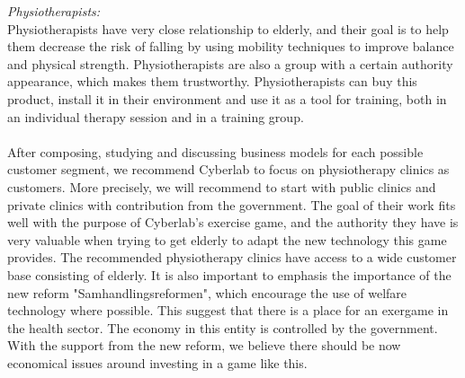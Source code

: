 \emph{Physiotherapists:} \\
Physiotherapists have very close relationship to elderly, and their goal is to help them decrease the risk of falling by using mobility techniques to improve balance and physical strength. Physiotherapists are also a group with a certain authority appearance, which makes them trustworthy. Physiotherapists can buy this product, install it in their environment and use it as a tool for training, both in an individual therapy session and in a training group. \\ \\
After composing, studying and discussing business models for each possible customer segment, we recommend Cyberlab to focus on physiotherapy clinics as customers. More precisely,  we will recommend to start with public clinics and private clinics with contribution from the government. The goal of their work fits well with the purpose of Cyberlab's exercise game, and the authority they have is very valuable when trying to get elderly to adapt the new technology this game provides. The recommended physiotherapy clinics have access to a wide customer base consisting of elderly. It is also important to emphasis the importance of the new reform "Samhandlingsreformen", which encourage the use of welfare technology where possible. This suggest that there is a place for an exergame in the health sector.  The economy in this entity is controlled by the government. With the support from the new reform, we believe there should be now economical issues around investing in a game like this. 

